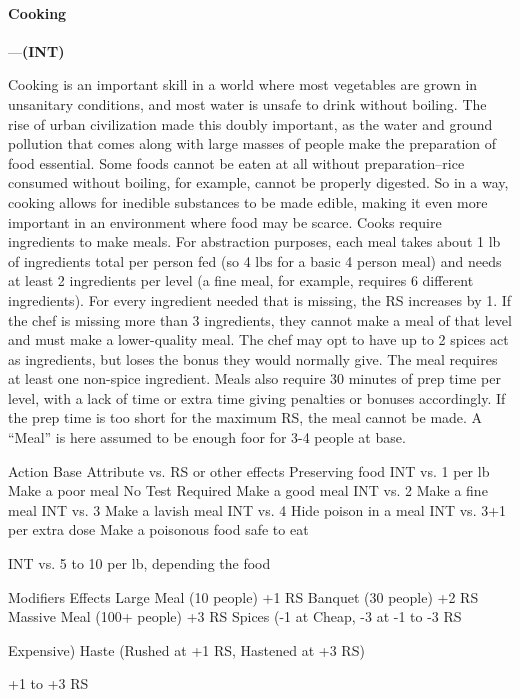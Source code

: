 \documentclass[oneside,11pt,english]{book}
\begin{document}
 

\paragraph{\label{skill:Cooking}Cooking}---\quad\textbf{(INT) }\par
Cooking is an important skill in a world where most vegetables are grown in unsanitary conditions, and most water is unsafe to drink without boiling. The rise of urban civilization made this doubly important, as the water and ground pollution that comes along with large masses of people make the preparation of food essential. Some foods cannot be eaten at all without preparation--rice consumed without boiling, for example, cannot be properly digested. So in a way, cooking allows for inedible substances to be made edible, making it even more important in an environment where food may be scarce. Cooks require ingredients to make meals. For abstraction purposes, each meal takes about 1 lb of ingredients total per person fed (so 4 lbs for a basic 4 person meal) and needs at least 2 ingredients per level (a fine meal, for example, requires 6 different ingredients). For every ingredient needed that is missing, the RS increases by 1. If the chef is missing more than 3 ingredients, they cannot make a meal of that level and must make a lower-quality meal. The chef may opt to have up to 2 spices act as ingredients, but loses the bonus they would normally give. The meal requires at least one non-spice ingredient. Meals also require 30 minutes of prep time per level, with a lack of time or extra time giving penalties or bonuses accordingly. If the prep time is too short for the maximum RS, the meal cannot be made. A “Meal” is here assumed to be enough foor for 3-4 people at base.


Action Base Attribute vs. RS or other effects 
Preserving food INT vs. 1 per lb 
Make a poor meal No Test Required 
Make a good meal INT vs. 2 
Make a fine meal INT vs. 3 
Make a lavish meal INT vs. 4 
Hide poison in a meal INT vs. 3+1 per extra dose 
Make a poisonous food safe to 
eat 

INT vs. 5 to 10 per lb, depending the food 

Modifiers Effects 
Large Meal (10 people) +1 RS 
Banquet (30 people) +2 RS 
Massive Meal (100+ people) +3 RS 
Spices (-1 at Cheap, -3 at -1 to -3 RS 


Expensive) 
Haste (Rushed at +1 RS, 
Hastened at +3 RS) 

+1 to +3 RS 
\end{document}
